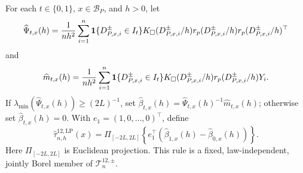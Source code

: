 For each \(t\in\{0,1\}\), \(x\in\mathcal B_P\), and \(h>0\), let
\[
 \widehat\Psi_{t,x}(h)={1\over nh^2}\sum_{i=1}^n
 \mathbf 1\{D^{\pm}_{P,x,i}\in I_t\}K_\square(D^{\pm}_{P,x,i}/h)
 r_p(D^{\pm}_{P,x,i}/h)r_p(D^{\pm}_{P,x,i}/h)^\top
\]
and
\[
 \widehat m_{t,x}(h)={1\over nh^2}\sum_{i=1}^n
 \mathbf 1\{D^{\pm}_{P,x,i}\in I_t\}K_\square(D^{\pm}_{P,x,i}/h)
 r_p(D^{\pm}_{P,x,i}/h)Y_i.
\]
If \(\lambda_{\min}(\widehat\Psi_{t,x}(h))\geq(2L)^{-1}\), set
\(\widehat\beta_{t,x}(h)=\widehat\Psi_{t,x}(h)^{-1}\widehat m_{t,x}(h)\); otherwise set \(\widehat\beta_{t,x}(h)=0\).  With \(e_1=(1,0,\ldots,0)^\top\), define
\[
 \widehat\tau^{12,\mathrm{LP}}_{n,h}(x)=
 \Pi_{[-2L,2L]}\!\left\{e_1^\top(\widehat\beta_{1,x}(h)-\widehat\beta_{0,x}(h))\right\}.
\]
Here \(\Pi_{[-2L,2L]}\) is Euclidean projection.  This rule is a fixed, law-independent, jointly Borel member of \(\mathcal T^{12,\pm}_n\).